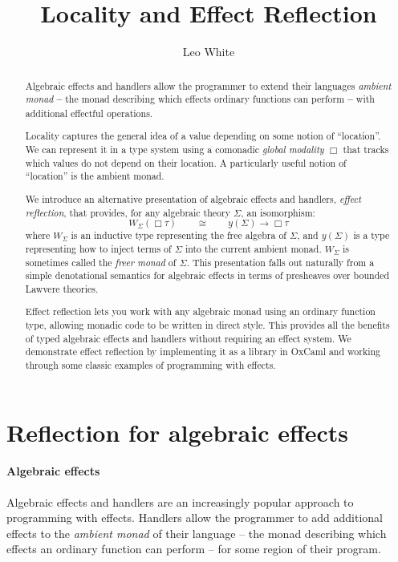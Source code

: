 \documentclass[acmsmall, screen, nonacm]{acmart}
\title{Locality and Effect Reflection}
\author{Leo White}
\affiliation{\institution{Jane Street}\country{UK}}
\date{}
\newcommand{\glob}{\mathop{\Box}}
\newcommand{\yoneda}[1]{y(#1)}
\newcommand{\ind}[1]{W_{#1}}
\begin{document}
\begin{abstract}
  Algebraic effects and handlers allow the programmer to extend their
  languages \emph{ambient monad} \textbf{--} the monad describing which
  effects ordinary functions can perform \textbf{--} with additional
  effectful operations.

  Locality captures the general idea of a value depending on some notion
  of ``location''. We can represent it in a type system using a
  comonadic \emph{global modality} $\glob$ that tracks which values do
  not depend on their location. A particularly useful notion of
  ``location'' is the ambient monad.

  We introduce an alternative presentation of algebraic effects and
  handlers, \emph{effect reflection}, that provides, for any algebraic
  theory $\Sigma$, an isomorphism:
  \begin{equation*}
    \ind{\Sigma}(\glob \tau) \qquad \cong \qquad \yoneda{\Sigma} \rightarrow \glob \tau
  \end{equation*}
  where $\ind{\Sigma}$ is an inductive type representing the free
  algebra of $\Sigma$, and $\yoneda{\Sigma}$ is a type representing how
  to inject terms of $\Sigma$ into the current ambient
  monad. $\ind{\Sigma}$ is sometimes called the \emph{freer monad} of
  $\Sigma$. This presentation falls out naturally from a simple
  denotational semantics for algebraic effects in terms of presheaves
  over bounded Lawvere theories.

  Effect reflection lets you work with any algebraic monad using an
  ordinary function type, allowing monadic code to be written in direct
  style. This provides all the benefits of typed algebraic effects and
  handlers without requiring an effect system. We demonstrate effect
  reflection by implementing it as a library in
  OxCaml\cite{lorenzen2024oxidizing,} and working through some classic
  examples of programming with effects.
\end{abstract}

\maketitle

\section{Reflection for algebraic effects}

\paragraph{Algebraic effects} Algebraic effects and handlers are an
increasingly popular approach to programming with effects. Handlers
allow the programmer to add additional effects to the \emph{ambient
  monad} of their language -- the monad describing which effects an
ordinary function can perform -- for some region of their program.
\end{document}
